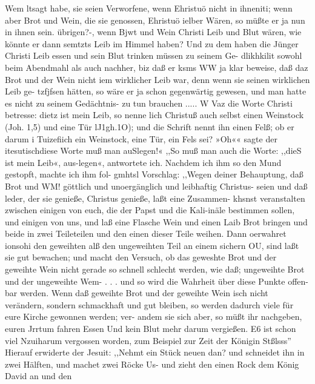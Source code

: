 Wem ltsagt habe, sie seien Verworfene, wenn Ehristuö nicht in
ihneniti; wenn aber Brot und Wein, die sie genossen, Ehristuö
ielber Wären, so müßte er ja nun in ihnen sein. übrigen?-, wenn
Bjwt und Wein Christi Leib und Blut wären, wie könnte er dann
semtzts Leib im Himmel haben? Und zu dem haben die Jünger
Christi Leib essen und sein Blut trinken müssen zu seinem Ge-
dlikhkilit sowohl beim Abendmahl als auch nachher, biz daß er
ksms WW ja klar beweise, daß daz Brot und der Wein nicht
iem wirklicher Leib war, denn wenn sie seinen wirklichen Leib ge-
tzfjfsen hätten, so wäre er ja schon gegenwärtig gewesen, und man
hatte es nicht zu seinem Gedächtnis- zu tun brauchen .....
W Vaz die Worte Christi betresse: dietz ist mein Leib, so nenne
lich Christuß auch selbst einen Weinstock (Joh. 1,5) und eine Tür
lJ1gh.1O); und die Schrift nennt ihn einen Felß; ob er darum
i Tuizefiich ein Weinstock, eine Tür, ein Fels sei? »Oh«« sagte der
itesutischdiese Worte muß man auSlegen!« ,,So muß man auch
die Worte: ,,dieS ist mein Leib«, aus-legen«, antwortete ich.
Nachdem ich ihm so den Mund gestopft, machte ich ihm fol-
gmhtsl Vorschlag: ,,Wegen deiner Behauptung, daß Brot und
WM! göttlich und unoergänglich und leibhaftig Christus- seien und
daß leder, der sie genieße, Christus genieße, laßt eine Zusammen-
khsnst veranstalten zwischen einigen von euch, die der Papst und
die Kali-inäle bestimmen sollen, und einigen von uns, und laß eine
Flasche Wein und einen Laib Brot bringen und beide in zwei
Teileteilen und den einen dieser Teile weihen. Dann oerwahret
ionsohi den geweihten alß den ungeweihten Teil an einem sichern
OU, sind laßt sie gut bewachen; und macht den Versuch, ob das
geweshte Brot und der geweihte Wein nicht gerade so schnell
schlecht werden, wie daß; ungeweihte Brot und der ungeweihte
Wem- . . . und so wird die Wahrheit über diese Punkte offen-
bar werden. Wenn daß geweihte Brot und der geweihte Wein
isch nicht verändern, sondern schmackhaft und gut bleiben, so
werden dadurch viele für eure Kirche gewonnen werden; ver-
andem sie sich aber, so müßt ihr nachgeben, euren Jrrtum fahren
Essen Und kein Blut mehr darum vergießen. E6 ist schon viel
Nzuiharum vergossen worden, zum Beispiel zur Zeit der Königin
Stßlsss'' Hierauf erwiderte der Jesuit: ,,Nehmt ein Stück neuen
dan? und schneidet ihn in zwei Hälften, und machet zwei Röcke
Us- und zieht den einen Rock dem König David an und den



